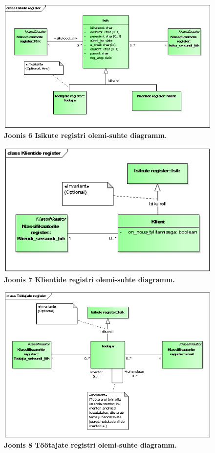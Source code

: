 \begin{figure}[H]
	\includegraphics[scale=1]{joonis6}
	\caption{\textbf{Joonis 6 Isikute registri olemi-suhte diagramm.}}
\end{figure}

\begin{figure}[H]
	\includegraphics[scale=1]{joonis7}
	\caption{\textbf{Joonis 7 Klientide registri olemi-suhte diagramm.}}
\end{figure}

\begin{figure}[H]
	\includegraphics[scale=1]{joonis8}
	\caption{\textbf{Joonis 8 Töötajate registri olemi-suhte diagramm.}}
\end{figure}

